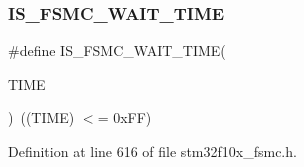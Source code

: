 \subsubsection{\texorpdfstring{I\+S\+\_\+\+F\+S\+M\+C\+\_\+\+W\+A\+I\+T\+\_\+\+T\+I\+ME}{IS\_FSMC\_WAIT\_TIME}}
{\footnotesize\ttfamily \#define I\+S\+\_\+\+F\+S\+M\+C\+\_\+\+W\+A\+I\+T\+\_\+\+T\+I\+ME(\begin{DoxyParamCaption}\item[{}]{T\+I\+ME }\end{DoxyParamCaption})~((T\+I\+ME) $<$= 0x\+F\+F)}



Definition at line 616 of file stm32f10x\+\_\+fsmc.\+h.

